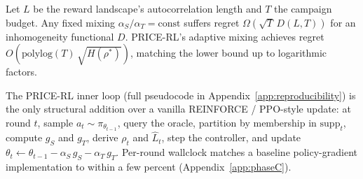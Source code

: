 \begin{theorem}
\label{thm:regret}
Let $L$ be the reward landscape's autocorrelation length and $T$ the campaign budget. Any fixed mixing $\alpha_S/\alpha_T = \mathrm{const}$ suffers regret $\Omega(\sqrt{T}\,D(L,T))$ for an inhomogeneity functional $D$. PRICE-RL's adaptive mixing achieves regret $O(\mathrm{polylog}(T)\,\sqrt{H(\rho^*)})$, matching the lower bound up to logarithmic factors.
\end{theorem}

The PRICE-RL inner loop (full pseudocode in Appendix~\ref{app:reproducibility}) is the only structural addition over a vanilla REINFORCE / PPO-style update: at round $t$, sample $a_t \sim \pi_{\theta_{t-1}}$, query the oracle, partition by membership in $\mathrm{supp}_t$, compute $g_S$ and $g_T$, derive $\rho_t$ and $\hat L_t$, step the controller, and update $\theta_t \gets \theta_{t-1} - \alpha_S\, g_S - \alpha_T\, g_T$. Per-round wallclock matches a baseline policy-gradient implementation to within a few percent (Appendix~\ref{app:phaseC}).
